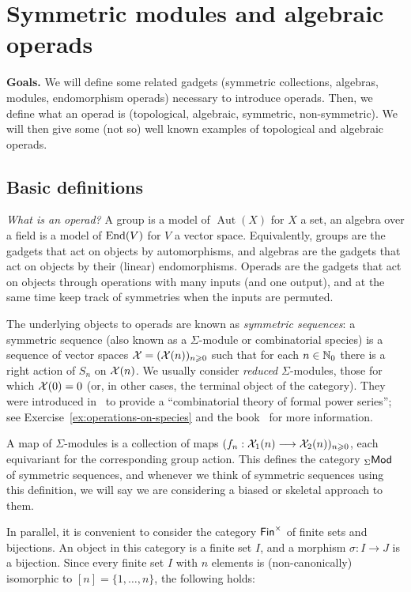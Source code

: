 \section{Symmetric modules and algebraic operads}\label{lecture:thebasics}

\textbf{Goals.}
We will define
some related gadgets (symmetric collections,
algebras, modules, endomorphism operads)
necessary to introduce operads. 
Then, we define what an operad is (topological,
algebraic, symmetric, non-symmetric). 
We will then give some
(not so) well known examples of topological
and algebraic operads.

\subsection{Basic definitions}
\emph{What is an operad?} A group is a model of
$\operatorname{Aut}(X)$ for $X$ a set, an algebra
over a field
is a model of $\operatorname{End}(V)$ for $V$
a vector space. Equivalently, groups are the
gadgets that act on objects by automorphisms,
and algebras are the gadgets that act
on objects by their (linear) endomorphisms. 
Operads are the gadgets that act on
objects through operations with many 
inputs (and one output), and at the same
time keep track of symmetries when
the inputs are permuted.

The underlying objects to operads are known as
\emph{symmetric sequences}: a symmetric sequence
(also known as a $\Sigma$-module or combinatorial 
species) is a sequence of vector spaces
$\mathcal{X} = (\mathcal{X}(n))_{n\geqslant 0}$ such that for
each $n\in\mathbb N_0$ there is a right action of
$S_n$ on $\mathcal{X}(n)$. We usually consider \emph{reduced}
$\Sigma$-modules, those for which $\mathcal{X}(0)=0$
(or, in other cases, the terminal object of the
category). They were introduced in~\cite{Joyal1981}
to provide a ``combinatorial theory of formal
power series''; see Exercise~\ref{ex:operations-on-species} and 
the book~\cite{Bergeron1997} for more information.

A map of $\Sigma$-modules is a collection of maps
$(f_n : \mathcal{X}_1(n) \longrightarrow \mathcal{X}_2(n))_{n\geqslant 0}$,
each equivariant for the corresponding group action. 
This defines the category ${}_\Sigma\mathsf{Mod}$ of symmetric
sequences, and whenever we think of symmetric sequences
using this definition, we will say we are considering  
a biased or skeletal approach to them.

In parallel, it is convenient to consider the 
category $\mathsf{Fin}^\times$ of finite sets and bijections.
An object in this category is a finite set $I$,
and a morphism $\sigma : I\longrightarrow J$ is a
bijection. Since every finite set $I$ with $n$
elements is (non-canonically) isomorphic to 
$[n] =\{1,\ldots,n\}$, the following holds:


